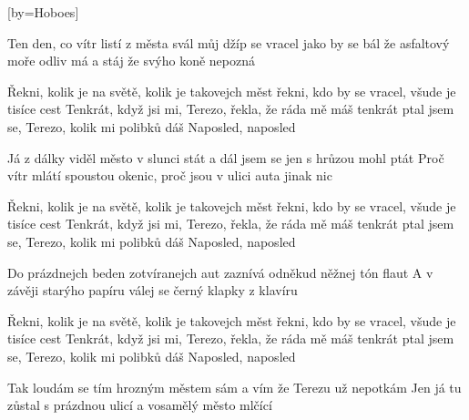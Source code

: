 [by={Hoboes}]

\beginverse{}
Ten den, co vítr listí z města svál
můj džíp se vracel jako by se bál
že asfaltový moře odliv má a stáj že svýho koně nepozná
\endverse{}

\beginchorus{}
Řekni, kolik je na světě, kolik je takovejch měst
řekni, kdo by se vracel, všude je tisíce cest
Tenkrát, když jsi mi, Terezo, řekla, že ráda mě máš
tenkrát ptal jsem se, Terezo, kolik mi polibků dáš
Naposled, naposled
\endchorus{}

\beginverse{}
\chordsoff{}
Já z dálky viděl město v slunci stát
a dál jsem se jen s hrůzou mohl ptát
Proč vítr mlátí spoustou okenic, proč jsou v ulici auta jinak nic
\chordson{}
\endverse{}

\repeatingchorus{}
\beginchorus{}
\chordsoff{}
Řekni, kolik je na světě, kolik je takovejch měst
řekni, kdo by se vracel, všude je tisíce cest
Tenkrát, když jsi mi, Terezo, řekla, že ráda mě máš
tenkrát ptal jsem se, Terezo, kolik mi polibků dáš
Naposled, naposled
\chordson{}
\endchorus{}

\beginverse{}
\chordsoff{}
Do prázdnejch beden zotvíranejch aut
zaznívá odněkud něžnej tón flaut
A v závěji starýho papíru válej se černý klapky z klavíru
\chordson{}
\endverse{}

\repeatingchorus{}
\beginchorus{}
\chordsoff{}
Řekni, kolik je na světě, kolik je takovejch měst
řekni, kdo by se vracel, všude je tisíce cest
Tenkrát, když jsi mi, Terezo, řekla, že ráda mě máš
tenkrát ptal jsem se, Terezo, kolik mi polibků dáš
Naposled, naposled
\chordson{}
\endchorus{}

\beginverse{}
\chordsoff{}
Tak loudám se tím hrozným městem sám
a vím že Terezu už nepotkám
Jen já tu zůstal s prázdnou ulicí a vosamělý město mlčící
\chordson{}
\endverse{}

